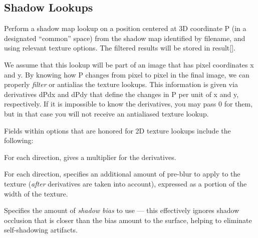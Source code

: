 \newpage
\subsection{Shadow Lookups}
\label{sec:texturesys:api:shadow}


Perform a shadow map lookup on a position centered at 3D
coordinate {\cf P} (in a designated ``common'' space) from the shadow map identified by
{\cf filename}, and using relevant texture {\cf options}.  The filtered
results will be stored in {\cf result[]}.

We assume that this lookup will be part of an image that has pixel
coordinates {\cf x} and {\cf y}.  By knowing how {\cf P} changes from
pixel to pixel in the final image, we can properly \emph{filter} or
antialias the texture lookups.  This information is given via
derivatives {\cf dPdx} and {\cf dPdy} that define the changes in {\cf P}
per unit of {\cf x} and {\cf y}, respectively.  If it is impossible to
know the derivatives, you may pass 0 for them, but in that case you will
not receive an antialiased texture lookup.

Fields within {\cf options} that are honored for 2D texture lookups
include the following:

\vspace{-12pt}
\vspace{10pt}
For each direction, gives a multiplier for the derivatives.
\apiend

\vspace{-24pt}
\vspace{10pt}
For each direction, specifies an additional amount of pre-blur to apply
to the texture (\emph{after} derivatives are taken into account),
expressed as a portion of the width of the texture.
\apiend

\vspace{-24pt}
\vspace{10pt}
Specifies the amount of \emph{shadow bias} to use --- this effectively
ignores shadow occlusion that is closer than the bias amount to the
surface, helping to eliminate self-shadowing artifacts.
\apiend

